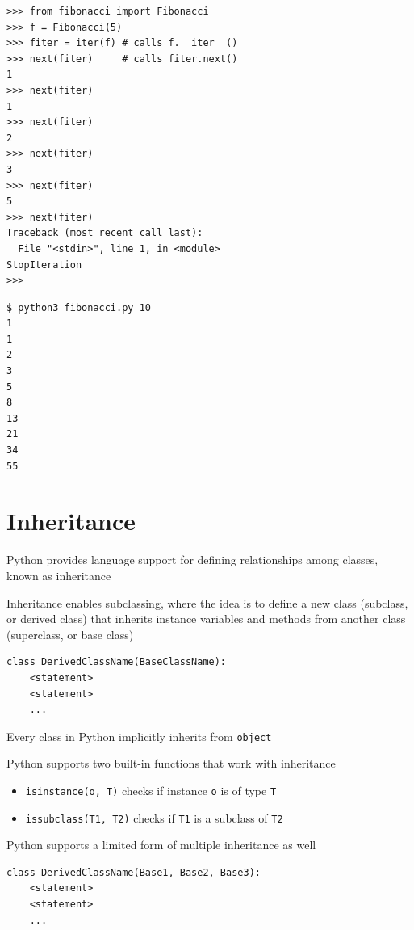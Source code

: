 \documentclass[8pt,a4paper,compress]{beamer}
\begin{document}
\begin{frame}[fragile]
\pause

\begin{lstlisting}[language={},style=focusin]
>>> from fibonacci import Fibonacci
>>> f = Fibonacci(5)
>>> fiter = iter(f) # calls f.__iter__()
>>> next(fiter)     # calls fiter.next()
1
>>> next(fiter)
1
>>> next(fiter)
2
>>> next(fiter)
3
>>> next(fiter)
5
>>> next(fiter)
Traceback (most recent call last):
  File "<stdin>", line 1, in <module>
StopIteration
>>> 
\end{lstlisting}

\pause
\bigskip

\begin{lstlisting}[language={},style=focusin]
$ python3 fibonacci.py 10
1
1
2
3
5
8
13
21
34
55
\end{lstlisting}
\end{frame}

\section{Inheritance}
\begin{frame}[fragile]
\pause

Python provides language support for defining relationships among classes, known as inheritance

\pause
\bigskip

Inheritance enables subclassing, where the idea is to define a new class (subclass, or derived class) that inherits instance variables and methods from another class (superclass, or base class)

\begin{lstlisting}[language={},style=focusin]
class DerivedClassName(BaseClassName):
    <statement>
    <statement>
    ...
\end{lstlisting}

\pause
\bigskip

Every class in Python implicitly inherits from \lstinline{object}

\pause
\bigskip

Python supports two built-in functions that work with inheritance
\begin{itemize}
\pause
\item \lstinline{isinstance(o, T)} checks if instance \lstinline{o} is of type \lstinline{T}
\pause
\item \lstinline{issubclass(T1, T2)} checks if \lstinline{T1} is a subclass of \lstinline{T2}
\end{itemize}

\pause
\bigskip

Python supports a limited form of multiple inheritance as well

\begin{lstlisting}[language={},style=focusin]
class DerivedClassName(Base1, Base2, Base3):
    <statement>
    <statement>
    ...
\end{lstlisting}
\end{frame}
\end{document}
